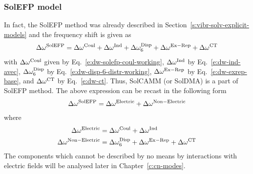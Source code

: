 \documentclass[a4paper,titlepage,twoside,fleqn,12pt]{book}
\begin{document}
\begin{refsection}
\subsubsection{SolEFP model\label{s:solefp-working-model}}

In fact, the SolEFP method was already described in Section~\ref{s:vibr-solv-explicit-models}
and the frequency shift is given as
%
\begin{equation} \label{e:dw-solefp}
\Delta\omega^{\rm SolEFP} = 
\Delta\omega^{\rm Coul} + \Delta\omega^{\rm Ind} + \Delta\omega^{\rm Disp}_6 +
\Delta\omega^{\rm Ex-Rep} + \Delta\omega^{\rm CT}
\end{equation}
%
with $\Delta\omega^{\rm Coul}$ given by Eq.~\eqref{e:dw-solefp-coul-working},  
$\Delta\omega^{\rm Ind}$ by Eq.~\eqref{e:dw-ind-avec},
$\Delta\omega^{\rm Disp}_6$ by Eq.~\eqref{e:dw-disp-6-distr-working},
$\Delta\omega^{\rm Ex-Rep}$ by Eq.~\eqref{e:dw-exrep-base},
and $\Delta\omega^{\rm CT}$ by Eq.~\eqref{e:dw-ct}.
Thus, SolCAMM (or SolDMA) is a part of SolEFP method.
The above expression can be recast in the following form
%
\begin{equation} \label{e:dw-solefp-electric-nonelectric}
\Delta\omega^{\rm SolEFP} = 
\Delta\omega^{\rm Electric} + \Delta\omega^{\rm Non-Electric}
\end{equation}
%
where
%
\begin{subequations} 
\begin{align}
\Delta\omega^{\rm Electric}       &=  \Delta\omega^{\rm Coul} + \Delta\omega^{\rm Ind} \label{e:dw-solefp-electric} \\ 
 \Delta\omega^{\rm Non-Electric}  &=  \Delta\omega^{\rm Disp}_6 +
\Delta\omega^{\rm Ex-Rep} + \Delta\omega^{\rm CT} \label{e:dw-solefp-nonelectric}
\end{align}
\end{subequations}
%
The components which cannot be described by no means by interactions
with electric fields  will be analysed later in Chapter~\ref{c:cn-modes}.


\end{refsection}
\end{document}
